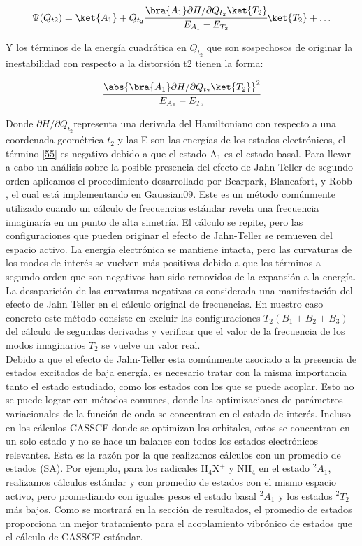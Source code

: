 \documentclass[12pt]{report}
\begin{document}
\begin{align*}
\Psi(Q_{t2})= \ket{A_1}+Q_{t_2} \cfrac{\bra{A_1}\partial H/ \partial Q_{t_2} \ket{T_2} }{E_{A_1}-E_{T_2}} \ket{T_2}+ \dots
\end{align*}

\newpage	

Y los términos de la energía cuadrática en $Q_{t_2}$ que son sospechosos de originar la inestabilidad con respecto a la distorsión t2 tienen la forma:

\begin{align}
\cfrac{\abs{\bra{A_1} \partial H / \partial Q_{t_2} \ket{T_2} }^2}{E_{A_1}-E_{T_2}}
\label{55}
\end{align}

Donde $\partial H / \partial Q_{t_2} $representa una derivada del Hamiltoniano con respecto a una coordenada geométrica $t_2$ y las E son las energías de los estados electrónicos, el término \ref{55} es negativo debido a que el estado A$_1$ es el estado basal.
Para llevar a cabo un análisis sobre la posible presencia del efecto de Jahn-Teller de segundo orden aplicamos el procedimiento desarrollado por Bearpark, Blancafort, y Robb \cite{Bearpark2002}, el cual está implementando en Gaussian09\cite{Gaussian}. Este es un método comúnmente utilizado cuando un cálculo de frecuencias estándar revela una frecuencia imaginaría en un punto de alta simetría. El cálculo se repite, pero las configuraciones que pueden originar el efecto de Jahn-Teller se remueven del espacio activo. La energía electrónica se mantiene intacta, pero las curvaturas de los modos de interés se vuelven más positivas debido a que los términos a segundo orden que son negativos han sido removidos de la expansión a la energía. La desaparición de las curvaturas negativas es considerada una manifestación del efecto de Jahn Teller en el cálculo original de frecuencias. En nuestro caso concreto este método consiste en excluir las configuraciones $T_2 (B_1+B_2+B_3)$ del cálculo de segundas derivadas y verificar que el valor de la frecuencia de los modos imaginarios $T_2$ se vuelve un valor real.
\\


Debido a que el efecto de Jahn-Teller esta comúnmente asociado a la presencia de estados excitados de baja energía, es necesario tratar con la misma importancia tanto el estado estudiado, como los estados con los que se puede acoplar. Esto no se puede lograr con métodos comunes, donde las optimizaciones de parámetros variacionales de la función de onda se concentran en el estado de interés. Incluso en los cálculos CASSCF donde se optimizan los orbitales, estos se concentran en un solo estado y no se hace un balance con todos los estados electrónicos relevantes. Esta es la razón por la que realizamos cálculos con un promedio de estados (SA). Por ejemplo, para los radicales H$_4$X$^+$ y NH$_4$ en el estado $^2A_1$, realizamos cálculos estándar y con promedio de estados con el mismo espacio activo, pero promediando con iguales pesos el estado basal $^2A_1$ y los estados $^2T_2$ más bajos. Como se mostrará en la sección de resultados, el promedio de estados proporciona un mejor tratamiento para el acoplamiento vibrónico de estados que el cálculo de CASSCF estándar.
\end{document}
